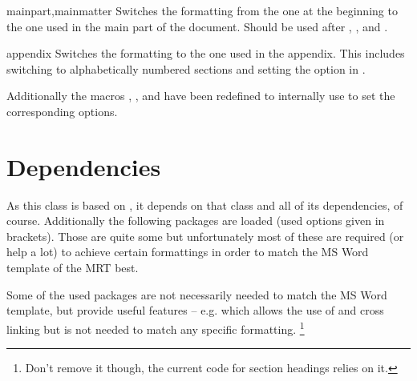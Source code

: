 \begin{describemacro}{mainpart,mainmatter}
  Switches the formatting from the one at the beginning to the one used in the
  main part of the document. Should be used after ,
  , and .
\end{describemacro}
\begin{describemacro}{appendix}
  Switches the formatting to the one used in the appendix. This includes
  switching to alphabetically numbered sections and setting the option  in .
\end{describemacro}
Additionally the macros , , and  have been
redefined to internally use  to set the corresponding
options.

\section{Dependencies}\label{sec:thesis:dep}%
As this class is based on , it depends on that class and all of
its dependencies, of course. Additionally the following packages are loaded
(used options given in brackets). Those are quite some but unfortunately most of
these are required (or help a lot) to achieve certain formattings in order to
match the MS Word template of the MRT best.

Some of the used packages are not necessarily needed to match the MS Word
template, but provide useful features -- e.g.   which allows the
use of  and cross linking but is not needed to match any specific
formatting.%
\footnote
  {Don't remove it though, the current code for section headings relies on it.}

